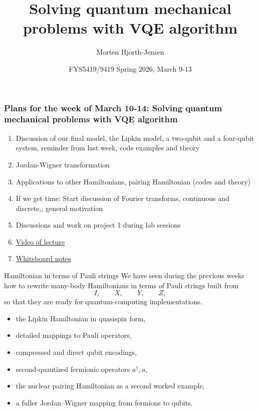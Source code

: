 \documentclass[aspectratio=169]{beamer}
\title{Solving quantum mechanical problems with VQE algorithm}
\author{Morten Hjorth-Jensen}
\date{FYS5419/9419 Spring 2026, March 9-13}
\begin{document}
\frame{\titlepage}

\begin{frame}
\frametitle{Plans for the week of March 10-14: Solving quantum mechanical problems with VQE algorithm}

\begin{block}{}
\begin{enumerate}
\item Discussion of  our final model, the Lipkin model, a two-qubit and a four-qubit system, reminder from last week, code examples and theory



\item Jordan-Wigner transformation

\item Applications to other Hamiltonians, pairing Hamiltonian  (codes and theory)

\item If we get time: Start discussion of Fourier transforms, continuous and discrete,, general motivation

\item Discussions and work on project 1 during lab sessions
\item \href{{https://youtu.be/C8vxBY-AmD8}}{Video of lecture}
\item \href{{https://github.com/CompPhysics/QuantumComputingMachineLearning/blob/gh-pages/doc/HandWrittenNotes/2026/Notesweek8.pdf}}{Whiteboard notes}
\end{enumerate}

\noindent
\end{block}
\end{frame}



\begin{frame}{Hamiltonian in terms of Pauli strings}
We have seen during the previous weeks how to rewrite many-body Hamiltonians in terms of Pauli strings
built from
\[
I,\qquad X,\qquad Y,\qquad Z,
\]
so that they are ready for quantum-computing implementations.

\medskip

\begin{itemize}
\item the Lipkin Hamiltonian in quasispin form,
\item detailed mappings to Pauli operators,
\item compressed and direct qubit encodings,
\item second-quantized fermionic operators \(a^\dagger,a\),
\item the nuclear pairing Hamiltonian as a second worked example,
\item a fuller Jordan--Wigner mapping from fermions to qubits.
\end{itemize}
\end{frame}
\end{document}
